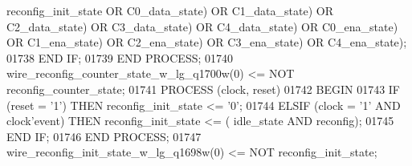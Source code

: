 \begin{DoxyCode}
{{      reconfig_init_state} \textcolor{keywordflow}{OR} \textcolor{vhdlchar}{C0_data_state}\textcolor{vhdlchar}{)} \textcolor{keywordflow}{OR} \textcolor{vhdlchar}{C1_data_state}\textcolor{vhdlchar}{)} \textcolor{keywordflow}{OR} \textcolor{vhdlchar}{C2_data_state}\textcolor{vhdlchar}{)} \textcolor{keywordflow}{OR} \textcolor{vhdlchar}{
      C3_data_state}\textcolor{vhdlchar}{)} \textcolor{keywordflow}{OR} \textcolor{vhdlchar}{C4_data_state}\textcolor{vhdlchar}{)} \textcolor{keywordflow}{OR} \textcolor{vhdlchar}{C0_ena_state}\textcolor{vhdlchar}{)} \textcolor{keywordflow}{OR} \textcolor{vhdlchar}{C1_ena_state}\textcolor{vhdlchar}{)} \textcolor{keywordflow}{OR} \textcolor{vhdlchar}{
      C2_ena_state}\textcolor{vhdlchar}{)} \textcolor{keywordflow}{OR} \textcolor{vhdlchar}{C3_ena_state}\textcolor{vhdlchar}{)} \textcolor{keywordflow}{OR} \textcolor{vhdlchar}{C4_ena_state}\textcolor{vhdlchar}{)};
01738         \textcolor{keywordflow}{END} \textcolor{keywordflow}{IF};
01739     \textcolor{keywordflow}{END} \textcolor{keywordflow}{PROCESS};
01740     \textcolor{vhdlchar}{wire_reconfig_counter_state_w_lg_q1700w}\textcolor{vhdlchar}{(}\textcolor{vhdllogic}{}\textcolor{vhdllogic}{0}\textcolor{vhdlchar}{)} \textcolor{vhdlchar}{<=} \textcolor{keywordflow}{NOT} \textcolor{vhdlchar}{reconfig_counter_state};
01741     \textcolor{keywordflow}{PROCESS} (clock, reset)
01742 \textcolor{vhdlkeyword}{    BEGIN}
01743         \textcolor{keywordflow}{IF} \textcolor{vhdlchar}{(}\textcolor{vhdlchar}{reset} \textcolor{vhdlchar}{=} \textcolor{vhdlchar}{'}\textcolor{vhdllogic}{}\textcolor{vhdllogic}{1}\textcolor{vhdlchar}{'}\textcolor{vhdlchar}{)} \textcolor{keywordflow}{THEN} \textcolor{vhdlchar}{reconfig_init_state} \textcolor{vhdlchar}{<=} \textcolor{vhdlchar}{'}\textcolor{vhdllogic}{}\textcolor{vhdllogic}{0}\textcolor{vhdlchar}{'};
01744         \textcolor{keywordflow}{ELSIF} \textcolor{vhdlchar}{(}\textcolor{vhdlchar}{clock} \textcolor{vhdlchar}{=} \textcolor{vhdlchar}{'}\textcolor{vhdllogic}{}\textcolor{vhdllogic}{1}\textcolor{vhdlchar}{'} \textcolor{keywordflow}{AND} \textcolor{vhdlchar}{clock}\textcolor{vhdlchar}{'}\textcolor{vhdlkeyword}{event}\textcolor{vhdlchar}{)} \textcolor{keywordflow}{THEN} \textcolor{vhdlchar}{reconfig_init_state} \textcolor{vhdlchar}{<=} \textcolor{vhdlchar}{(}\textcolor{vhdlchar}{
      idle_state} \textcolor{keywordflow}{AND} \textcolor{vhdlchar}{reconfig}\textcolor{vhdlchar}{)};
01745         \textcolor{keywordflow}{END} \textcolor{keywordflow}{IF};
01746     \textcolor{keywordflow}{END} \textcolor{keywordflow}{PROCESS};
01747     \textcolor{vhdlchar}{wire_reconfig_init_state_w_lg_q1698w}\textcolor{vhdlchar}{(}\textcolor{vhdllogic}{}\textcolor{vhdllogic}{0}\textcolor{vhdlchar}{)} \textcolor{vhdlchar}{<=} \textcolor{keywordflow}{NOT} \textcolor{vhdlchar}{reconfig_init_state};
}
\end{DoxyCode}
